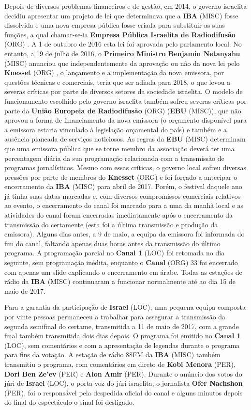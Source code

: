 \documentclass[12pt,a4paper]{article}
\begin{document}
Depois de diversos problemas financeiros e de gestão, em 2014, o governo israelita decidiu apresentar um projeto de lei que determinava que a \textbf{IBA} (MISC) fosse dissolvida e uma nova empresa pública fosse criada para substituir as suas funções, a qual chamar-se-ia \textbf{Empresa Pública Israelita de Radiodifusão} (ORG) . A 1 de outubro de 2016 esta lei foi aprovada pelo parlamento local. No entanto, a 19 de julho de 2016, o \textbf{Primeiro Ministro Benjamin Netanyahu} (MISC) anunciou que independentemente da aprovação ou não da nova lei pelo \textbf{Knesset} (ORG) , o lançamento e a implementação da nova emissora, por questões técnicas e comerciais, teria que ser adiada para 2018, o que levou a severas críticas por parte de diversos setores da sociedade israelita. O modelo de funcionamento escolhido pelo governo israelita também sofreu severas críticas por parte da \textbf{União Europeia de Radiodifusão} (ORG) (\textbf{EBU} (MISC)), que não aprovou a forma de financiamento da nova emissora (o orçamento disponível para a emissora estaria vinculado à legislação orçamental do país) e também e a ausência planeada de serviços noticiosos. As regras da \textbf{EBU} (MISC) determinam que uma emissora pública que se torne membro da associação deverá ter uma percentagem diária da sua programação relacionada com a transmissão de programas jornalísticos. Mesmo com essas críticas, o governo local sofreu diversas pressões por parte de membros do \textbf{Knesset} (ORG) e foi forçado a antecipar o encerramento da \textbf{IBA} (MISC) para abril de 2017. Porém, o festival daquele ano já tinha suas datas marcadas e, com diversos compromissos comerciais relativos ao evento, o encerramento do canal foi marcado para a uma da manhã local e as atividades do canal foram encerradas imediatamente após o encerramento da transmissão do certamente (esta foi a última transmissão e produção da emissora). Alguns dias antes, a 9 de maio, a equipa da emissora foi informada do fim do canal, faltando apenas duas horas antes da transmissão do último programa. A programação parcial no \textbf{Canal 1} (LOC) foi retomada no dia seguinte, sem programação inédita, enquanto o \textbf{Canal} (ORG) 33 foi encerrado com apenas um slide explicando o encerramento em árabe. Todas as estações de rádio da \textbf{IBA} (MISC) continuaram a funcionar normalmente até ao dia 15 de maio de 2017.

Para a garantia da participação de \textbf{Israel} (LOC), uma pequena equipa composta por vinte pessoas permaneceu a trabalhar para assegurar a transmissão da segunda semifinal do certame, transmitida a 11 de maio de 2017, com a grande final também transmitida dois dias depois. O programa foi emitido no \textbf{Canal 1} (LOC), sem comentários e com a apresentação de legendas durante o programa para fins da votação. A estação de rádio 88FM da \textbf{IBA} (MISC) também transmitiu o programa, com comentários em direto de \textbf{Kobi Menora} (PER), \textbf{Dori Ben Ze'ev} (PER) e \textbf{Alon Amir} (PER). Durante o anúncio dos votos do júri de \textbf{Israel} (LOC), o porta-voz do júri israelita, o jornalista \textbf{Ofer Nachshon} (PER), foi o responsável pela despedida oficial do canal e alguns minutos depois do final do espectáculo o sinal foi desligado.
\end{document}
